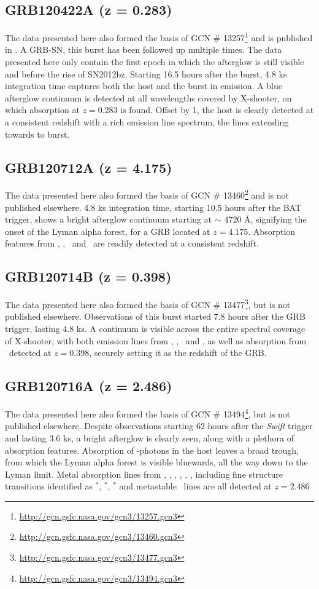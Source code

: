 \documentclass{aa}    %
\begin{document}
\subsection{GRB120422A (z = 0.283)}
The data presented here also formed the basis of GCN \#
13257\footnote{\url{http://gcn.gsfc.nasa.gov/gcn3/13257.gcn3}} and is published
in \citet{Schulze2014}. A GRB-SN, this burst has been followed up multiple
times. The data presented here only contain the first epoch in which the
afterglow is still visible and before the rise of SN2012bz. Starting 16.5 hours
after the burst, 4.8 ks integration time captures both the host and the burst
in emission. A blue afterglow continuum is detected at all wavelengths covered
by X-shooter, on which \mgii absorption at $z = 0.283$ is found. Offset by
1, the host is clearly detected at a consistent redshift with a rich
emission line spectrum, the lines extending towards to burst.

\subsection{GRB120712A (z = 4.175)}
The data presented here also formed the basis of GCN \#
13460\footnote{\url{http://gcn.gsfc.nasa.gov/gcn3/13460.gcn3}} and is not
published elsewhere. 4.8 ks integration time, starting 10.5 hours after the BAT
trigger, shows a bright afterglow continuum starting at $\sim$ 4720 \AA,
signifying the onset of the Lyman alpha forest, for a GRB located at $z =
4.175$. Absorption features from \lya, \feii, \mgii~and \SIii~are readily
detected at a consistent redshift.

\subsection{GRB120714B (z = 0.398)}
The data presented here also formed the basis of GCN \#
13477\footnote{\url{http://gcn.gsfc.nasa.gov/gcn3/13477.gcn3}}, but is not
published elsewhere. Observations of this burst started 7.8 hours after the GRB
trigger, lasting 4.8 ks. A continuum is visible across the entire spectral
coverage of X-shooter, with both emission lines from  \oii, \hb, \oiii~and \ha,
as well as absorption from \mgii~detected at $z = 0.398$, securely setting it
as the redshift of the GRB.


\subsection{GRB120716A (z = 2.486)}
The data presented here also formed the basis of GCN \#
13494\footnote{\url{http://gcn.gsfc.nasa.gov/gcn3/13494.gcn3}}, but is not
published elsewhere. Despite observations starting 62 hours after the
\textit{Swift} trigger and lasting 3.6 ks, a bright afterglow is clearly seen,
along with a plethora of absorption features. Absorption of \lya-photons in the
host leaves a broad trough, from which the Lyman alpha forest is visible
bluewards, all the way down to the Lyman limit. Metal absorption lines from
\cii, \SIii, \oi, \feii, \civ, \SIiv, including fine structure transitions
identified as \cii$^*$, \SIii$^*$, \feii$^*$ and metastable \NIii~lines are all
detected at $z = 2.486$
\end{document}
